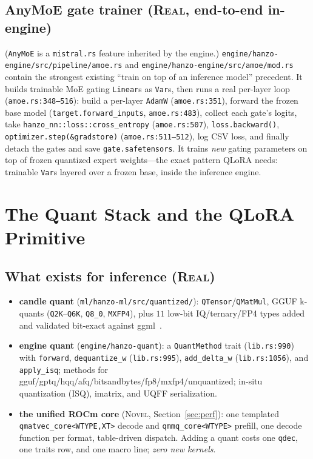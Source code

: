 \documentclass[11pt]{article}
\begin{document}
\subsection{AnyMoE gate trainer (\textsc{Real}, end-to-end in-engine)}

(\texttt{AnyMoE} is a \texttt{mistral.rs} feature inherited by the engine.) \texttt{engine/hanzo-engine/src/pipeline/amoe.rs} and \texttt{engine/hanzo-engine/src/amoe/mod.rs} contain the strongest existing ``train on top of an inference model'' precedent. It builds trainable MoE gating \texttt{Linear}s as \texttt{Var}s, then runs a real per-layer loop (\texttt{amoe.rs:348--516}): build a per-layer \texttt{AdamW} (\texttt{amoe.rs:351}), forward the frozen base model (\texttt{target.forward\_inputs}, \texttt{amoe.rs:483}), collect each gate's logits, take \texttt{hanzo\_nn::loss::cross\_entropy} (\texttt{amoe.rs:507}), \texttt{loss.backward()}, \texttt{optimizer.step(\&gradstore)} (\texttt{amoe.rs:511--512}), log CSV loss, and finally detach the gates and save \texttt{gate.safetensors}. It trains \emph{new} gating parameters on top of frozen quantized expert weights---the exact pattern QLoRA needs: trainable \texttt{Var}s layered over a frozen base, inside the inference engine.

\section{The Quant Stack and the QLoRA Primitive}
\label{sec:quant}

\subsection{What exists for inference (\textsc{Real})}

\begin{itemize}
    \item \textbf{candle quant} (\texttt{ml/hanzo-ml/src/quantized/}): \texttt{QTensor}/\texttt{QMatMul}, GGUF k-quants (\texttt{Q2K}--\texttt{Q6K}, \texttt{Q8\_0}, \texttt{MXFP4}), plus $11$ low-bit IQ/ternary/FP4 types added and validated bit-exact against ggml~\cite{hanzo-rocm}.
    \item \textbf{engine quant} (\texttt{engine/hanzo-quant}): a \texttt{QuantMethod} trait (\texttt{lib.rs:990}) with \texttt{forward}, \texttt{dequantize\_w} (\texttt{lib.rs:995}), \texttt{add\_delta\_w} (\texttt{lib.rs:1056}), and \texttt{apply\_isq}; methods for gguf/gptq/hqq/afq/bitsandbytes/fp8/mxfp4/unquantized; in-situ quantization (ISQ), imatrix, and UQFF serialization.
    \item \textbf{the unified ROCm core} (\textsc{Novel}, Section~\ref{sec:perf}): one templated \texttt{qmatvec\_core<WTYPE,XT>} decode and \texttt{qmmq\_core<WTYPE>} prefill, one decode function per format, table-driven dispatch. Adding a quant costs one \texttt{qdec}, one traits row, and one macro line; \emph{zero new kernels}.
\end{itemize}
\end{document}
